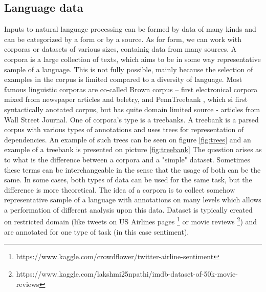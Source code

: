 \subsection{Language data}
Inputs to natural language processing can be formed by data of many kinds and can be categorized by a form or by a source. 
As for form, we can work with corporas or datasets of various sizes, containig data from many sources. A corpora is a large collection of texts, which aims to be in some way representative sample of a language. This is not fully possible, mainly because the selection of examples in the corpus is limited compared to a diversity of language. Most famous linguistic corporas are co-called Brown corpus \citep{francis79browncorpus} -- first electronical corpora mixed from newspaper articles and beletry, and PennTreebank \citep{Marcus1993}, which si first syntactically anotated corpus, but has quite domain limited source - articles from Wall Street Journal. One of corpora's type is a treebanks. A treebank is a parsed corpus with various types of annotations and uses trees for representation of dependencies. An example of such trees can be seen on figure \ref{fig:trees} and an example of a treebank is presented on picture \ref{fig:treebank}
The question arises as to what is the difference between a corpora and a "simple" dataset. Sometimes these terms can be interchangeable in the sense that the usage of both can be the same. In some cases, both types of data can be used for the same task, but the difference is more theoretical. The idea of a corpora is to collect somehow representative sample of a language with annotations on many levels which allows a performation of different analysis upon this data. Dataset is typically created on restricted domain (like tweets on US Airlines pages \footnote{https://www.kaggle.com/crowdflower/twitter-airline-sentiment} or movie reviews \footnote{https://www.kaggle.com/lakshmi25npathi/imdb-dataset-of-50k-movie-reviews}) 
and are annotated for one type of task (in this case sentiment).  
